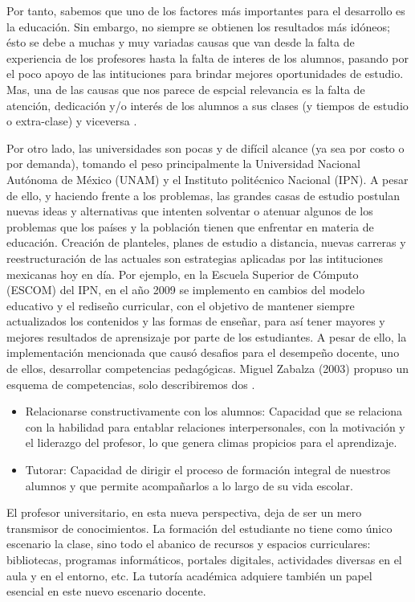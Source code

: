 \noindent
Por tanto, sabemos que uno de los factores más importantes para el desarrollo es la educación. Sin embargo, 
no siempre se obtienen los resultados más idóneos; ésto se debe a muchas y muy variadas causas que van 
desde la falta de experiencia de los profesores hasta la falta de interes de los alumnos, pasando por el 
poco apoyo de las intituciones para brindar mejores oportunidades de estudio. Mas, una de las causas 
que nos parece de espcial relevancia es la falta de atención, dedicación y/o interés de los alumnos a sus 
clases (y tiempos de estudio o extra-clase) y viceversa \cite{UV}. 

\noindent
Por otro lado, las universidades son pocas y de difícil alcance (ya sea por costo o por demanda), tomando 
el peso principalmente la Universidad Nacional Autónoma de México (UNAM) y el Instituto politécnico Nacional 
(IPN). A pesar de ello, y haciendo frente a los problemas, las grandes casas de estudio postulan nuevas ideas 
y alternativas que intenten solventar o atenuar algunos de los problemas que los países y la población tienen 
que enfrentar en materia de educación. 
Creación de planteles, planes de estudio a distancia, nuevas carreras y reestructuración de las actuales son 
estrategias aplicadas por las intituciones mexicanas hoy en día. Por ejemplo, en la Escuela Superior de 
Cómputo (ESCOM) del IPN, en el año 2009 se implemento en cambios del modelo educativo y el rediseño curricular, 
con el objetivo de mantener siempre actualizados los contenidos y las formas de enseñar, para así tener mayores
y mejores resultados de aprensizaje por parte de los estudiantes. 
A pesar de ello, la implementación mencionada que causó desafios para el desempeño docente, uno de ellos, 
desarrollar competencias pedagógicas. Miguel Zabalza (2003) propuso un esquema de competencias, solo 
describiremos dos \cite{Competencias}.

\begin{itemize}	
	\item Relacionarse constructivamente con los alumnos: Capacidad que  se relaciona con la  habilidad 
	para entablar relaciones  interpersonales, con la motivación y  el liderazgo del profesor, lo que  
	genera climas propicios para el  aprendizaje.
	\item Tutorar: Capacidad de dirigir el proceso de formación integral de nuestros alumnos y que 
	permite acompañarlos a lo largo de su vida escolar.
\end{itemize}

\noindent
El profesor universitario, en esta nueva perspectiva, deja de ser un mero transmisor de conocimientos. La 
formación del estudiante no tiene como único escenario la clase, sino todo el abanico de recursos y espacios 
curriculares: bibliotecas, programas informáticos, portales digitales, actividades diversas en el aula y 
en el entorno, etc. La tutoría académica adquiere también un papel esencial en este nuevo escenario docente. 
\cite{UAB}

